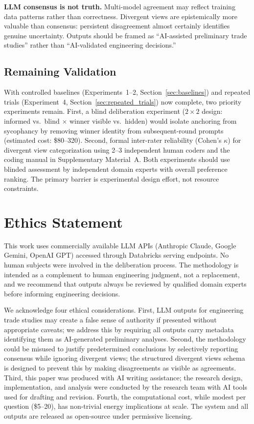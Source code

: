 \documentclass[11pt,a4paper]{article}
\begin{document}
\textbf{LLM consensus is not truth.} Multi-model agreement may reflect training data patterns rather than correctness. Divergent views are epistemically more valuable than consensus: persistent disagreement almost certainly identifies genuine uncertainty. Outputs should be framed as ``AI-assisted preliminary trade studies'' rather than ``AI-validated engineering decisions.''

\subsection{Remaining Validation}
\label{sec:validation_roadmap}

With controlled baselines (Experiments~1--2, Section~\ref{sec:baselines}) and repeated trials (Experiment~4, Section~\ref{sec:repeated_trials}) now complete, two priority experiments remain. First, a blind deliberation experiment ($2\times2$ design: informed vs.\ blind $\times$ winner visible vs.\ hidden) would isolate anchoring from sycophancy by removing winner identity from subsequent-round prompts (estimated cost: \$80--320). Second, formal inter-rater reliability (Cohen's $\kappa$) for divergent view categorization using 2--3 independent human coders and the coding manual in Supplementary Material~A. Both experiments should use blinded assessment by independent domain experts with overall preference ranking. The primary barrier is experimental design effort, not resource constraints.

\section{Ethics Statement}
\label{sec:ethics}

This work uses commercially available LLM APIs (Anthropic Claude, Google Gemini, OpenAI GPT) accessed through Databricks serving endpoints. No human subjects were involved in the deliberation process. The methodology is intended as a complement to human engineering judgment, not a replacement, and we recommend that outputs always be reviewed by qualified domain experts before informing engineering decisions.

We acknowledge four ethical considerations. First, LLM outputs for engineering trade studies may create a false sense of authority if presented without appropriate caveats; we address this by requiring all outputs carry metadata identifying them as AI-generated preliminary analyses. Second, the methodology could be misused to justify predetermined conclusions by selectively reporting consensus while ignoring divergent views; the structured divergent views schema is designed to prevent this by making disagreements as visible as agreements. Third, this paper was produced with AI writing assistance; the research design, implementation, and analysis were conducted by the research team with AI tools used for drafting and revision. Fourth, the computational cost, while modest per question (\$5--20), has non-trivial energy implications at scale. The system and all outputs are released as open-source under permissive licensing.
\end{document}
